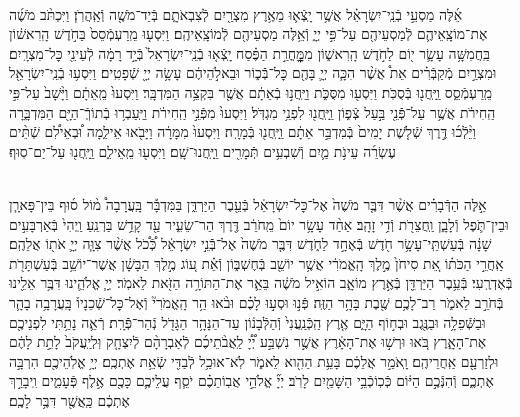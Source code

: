\documentclass[twoside, openany, parskip=half, 11pt]{book}
\begin{document}
\begin{sometimes}
\begin{footnotesize}
\begin{multicols}{2}
\\
אֵ֜לֶּה מַסְעֵ֣י בְֿנֵֽי־יִשְׂרָאֵ֗ל אֲשֶׁ֥ר יָֽצְֿא֛וּ מֵאֶ֥רֶץ מִצְרַ֖יִם לְֿצִבְאֹתָ֑ם בְּֿיַד־מֹשֶׁ֖ה וְֿאַֽהֲרֹֽן׃ וַיִּכְתֹּ֨ב מֹשֶׁ֜ה אֶת־מוֹצָֽאֵיהֶ֛ם לְֿמַסְעֵיהֶ֖ם עַל־פִּ֣י יְיָ֑ וְֿאֵ֥לֶּה מַסְעֵיהֶ֖ם לְֿמוֹצָֽאֵיהֶֽם׃ וַיִּסְע֤וּ מֵֽרַעְמְֿסֵס֙ בַּחֹ֣דֶשׁ הָֽרִאשׁ֔וֹן בַּֽחֲמִשָּׁ֥ה עָשָׂ֛ר י֖וֹם לַחֹ֣דֶשׁ הָֽרִאשׁ֑וֹן מִמׇׇׇׇׇׇׇׇׇׇׇׇָּֽחֳרַ֣ת הַפֶּ֗סַח יָֽצְֿא֤וּ בְֿנֵֽי־יִשְׂרָאֵל֙ בְּֿיָ֣ד רָמָ֔ה לְֿעֵינֵ֖י כׇּל־מִצְרָֽיִם׃  וּמִצְרַ֣יִם מְֿקַבְּֿרִ֗ים אֵת֩ אֲשֶׁ֨ר הִכָּ֧ה יְיָ֛ בָּהֶ֖ם כׇּל־בְּֿֿכ֑וֹר וּבֵאלֹ֣הֵיהֶ֔ם עָשָׂ֥ה יְיָ֖ שְֿׁפָטִֽים׃ וַיִּסְע֥וּ בְֿנֵֽי־יִשְׂרָאֵ֖ל מֵֽרַעְמְֿסֵ֑ס וַֽיַּֽחֲנ֖וּ בְּֿסֻכֹּֽת׃ וַיִּסְע֖וּ מִסֻּכֹּ֑ת וַיַּֽחֲנ֣וּ בְֿאֵתָ֔ם אֲשֶׁ֖ר בִּקְצֵ֥ה הַמִּדְבָּֽר׃  וַיִּסְעוּ֙ מֵֽאֵתָ֔ם וַיָּ֨שָׁב֙ עַל־פִּ֣י הַֽחִירֹ֔ת אֲשֶׁ֥ר עַל־פְּֿֿנֵ֖י בַּ֣עַל צְֿפ֑וֹן וַֽיַּֽחֲנ֖וּ לִפְנֵ֥י מִגְדֹּֽל׃ וַיִּסְעוּ֙ מִפְּֿנֵ֣י הַֽחִירֹ֔ת וַיַּֽעַבְר֥וּ בְֿתוֹךְֿ־הַיָּ֖ם הַמִּדְבָּ֑רָה וַיֵּ֨לְֿכ֜וּ דֶּ֣רֶךְ שְֿׁלֹ֤שֶׁת יָמִים֙ בְּֿמִדְבַּ֣ר אֵתָ֔ם וַֽיַּֽחֲנ֖וּ בְּֿמָרָֽה׃ וַיִּסְעוּ֙ מִמָּרָ֔ה וַיָּבֹ֖אוּ אֵילִ֑מָה וּ֠בְאֵילִ֠ם שְֿׁתֵּ֨ים עֶשְׂרֵ֜ה עֵינֹ֥ת מַ֛יִם וְֿשִׁבְעִ֥ים תְּֿמָרִ֖ים וַֽיַּֽחֲנוּ־שָֽׁם׃ וַיִּסְע֖וּ מֵֽאֵילִ֑ם וַֽיַּֽחֲנ֖וּ עַל־יַם־סֽוּף׃

\\
אֵ֣לֶּה הַדְּֿבָרִ֗ים אֲשֶׁ֨ר דִּבֶּ֤ר מֹשֶׁה֙ אֶל־כׇּל־יִשְׂרָאֵ֔ל בְּֿעֵ֖בֶר הַיַּרְדֵּ֑ן בַּמִּדְבָּ֡ר בָּֽעֲרָבָה֩ מ֨וֹל ס֜וּף בֵּין־פָּארָ֧ן וּבֵין־תֹּ֛פֶל וְֿלָבָ֑ן וַֽחֲצֵרֹ֖ת וְֿדִ֥י זָהָֽב׃ אַחַ֨ד עָשָׂ֥ר יוֹם֙ מֵֽחֹרֵ֔ב דֶּ֖רֶךְ הַר־שֵׂעִ֑יר עַ֖ד קָדֵ֥שׁ בַּרְנֵֽעַ׃ וַֽיְהִי֙ בְּֿאַרְבָּעִ֣ים שָׁנָ֔ה בְּֿעַשְׁתֵּֽי־עָשָׂ֥ר חֹ֖דֶשׁ בְּֿאֶחָ֣ד לַחֹ֑דֶשׁ דִּבֶּ֤ר מֹשֶׁה֙ אֶל־בְּֿֿנֵ֣י יִשְׂרָאֵ֔ל כְּֿ֠כֹ֠ל אֲשֶׁ֨ר צִוָּ֧ה יְיָ֛ אֹת֖וֹ אֲלֵהֶֽם׃  אַֽחֲרֵ֣י הַכֹּת֗וֹ אֵ֚ת סִיחֹן֙ מֶ֣לֶךְ הָֽאֱמֹרִ֔י אֲשֶׁ֥ר יוֹשֵׁ֖ב בְּֿחֶשְׁבּ֑וֹן וְֿאֵ֗ת ע֚וֹג מֶ֣לֶךְ הַבָּשָׁ֔ן אֲשֶׁר־יוֹשֵׁ֥ב בְּֿעַשְׁתָּרֹ֖ת בְּֿאֶדְרֶֽעִי׃ בְּֿעֵ֥בֶר הַיַּרְדֵּ֖ן בְּֿאֶ֣רֶץ מוֹאָ֑ב הוֹאִ֣יל מֹשֶׁ֔ה בֵּאֵ֛ר אֶת־הַתּוֹרָ֥ה הַזֹּ֖את לֵאמֹֽר׃ יְיָ֧ אֱלֹהֵ֛ינוּ דִּבֶּ֥ר אֵלֵ֖ינוּ בְּֿחֹרֵ֣ב לֵאמֹ֑ר רַב־לָכֶ֥ם שֶׁ֖בֶת בָּהָ֥ר הַזֶּֽה׃ פְּֿנ֣וּ וּסְע֣וּ לָכֶ֗ם וּבֹ֨אוּ הַ֥ר הָֽאֱמֹרִי֘ וְֿאֶל־כׇּל־שְֿׁכֵנָיו֒ בָּֽעֲרָבָ֥ה בָהָ֛ר וּבַשְּֿׁפֵלָ֥ה וּבַנֶּ֖גֶב וּבְח֣וֹף הַיָּ֑ם אֶ֤רֶץ הַֽכְּֿנַֽעֲנִי֙ וְֿהַלְּֿבָנ֔וֹן עַד־הַנָּהָ֥ר הַגָּדֹ֖ל נְֿהַר־פְּֿֿרָֽת׃  רְֿאֵ֛ה נָתַ֥תִּי לִפְנֵיכֶ֖ם אֶת־הָאָ֑רֶץ בֹּ֚אוּ וּרְשׁ֣וּ אֶת־הָאָ֔רֶץ אֲשֶׁ֣ר נִשְׁבַּ֣ע יְ֠יָ֠ לַֽאֲבֹ֨תֵיכֶ֜ם לְֿאַבְרָהָ֨ם לְֿיִצְחָ֤ק וּֽלְיַֽעֲקֹב֙ לָתֵ֣ת לָהֶ֔ם וּלְזַרְעָ֖ם אַֽחֲרֵיהֶֽם׃ וָֽאֹמַ֣ר אֲלֵכֶ֔ם בָּעֵ֥ת הַהִ֖וא לֵאמֹ֑ר לֹֽא־אוּכַ֥ל לְֿבַדִּ֖י שְֿׂאֵ֥ת אֶתְכֶֽם׃ יְיָ֥ אֱלֹֽהֵיכֶ֖ם הִרְבָּ֣ה אֶתְכֶ֑ם וְֿהִנְּֿכֶ֣ם הַיּ֔וֹם כְּֿכֽוֹכְֿבֵ֥י הַשָּׁמַ֖יִם לָרֹֽב׃ יְיָ֞ אֱלֹהֵ֣י אֲבֽוֹתֵכֶ֗ם יֹסֵ֧ף עֲלֵיכֶ֛ם כָּכֶ֖ם אֶ֣לֶף פְּֿעָמִ֑ים וִֽיבָרֵ֣ךְ אֶתְכֶ֔ם כַּֽאֲשֶׁ֖ר דִּבֶּ֥ר לָכֶֽם׃


\end{multicols}
\end{footnotesize}
\end{sometimes}
\end{document}
